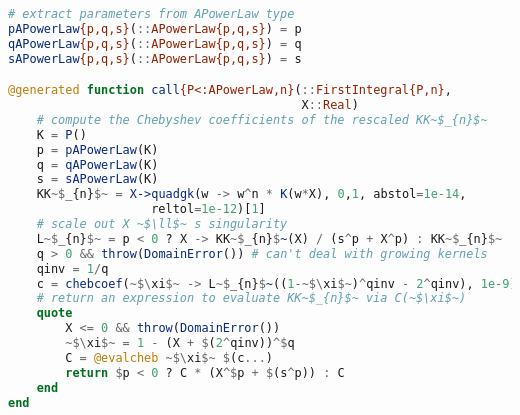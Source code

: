 \begin{singlespace}
\begin{lstlisting}[language=julia]
# extract parameters from APowerLaw type
pAPowerLaw{p,q,s}(::APowerLaw{p,q,s}) = p
qAPowerLaw{p,q,s}(::APowerLaw{p,q,s}) = q
sAPowerLaw{p,q,s}(::APowerLaw{p,q,s}) = s

@generated function call{P<:APowerLaw,n}(::FirstIntegral{P,n},
                                         X::Real)
    # compute the Chebyshev coefficients of the rescaled KK~$_{n}$~
    K = P()
    p = pAPowerLaw(K)
    q = qAPowerLaw(K)
    s = sAPowerLaw(K)
    KK~$_{n}$~ = X->quadgk(w -> w^n * K(w*X), 0,1, abstol=1e-14,
                    reltol=1e-12)[1]
    # scale out X ~$\ll$~ s singularity
    L~$_{n}$~ = p < 0 ? X -> KK~$_{n}$~(X) / (s^p + X^p) : KK~$_{n}$~
    q > 0 && throw(DomainError()) # can't deal with growing kernels
    qinv = 1/q
    c = chebcoef(~$\xi$~ -> L~$_{n}$~((1-~$\xi$~)^qinv - 2^qinv), 1e-9)
    # return an expression to evaluate KK~$_{n}$~ via C(~$\xi$~)
    quote
        X <= 0 && throw(DomainError())
        ~$\xi$~ = 1 - (X + $(2^qinv))^$q
        C = @evalcheb ~$\xi$~ $(c...)
        return $p < 0 ? C * (X^$p + $(s^p)) : C
    end
end

\end{lstlisting}
\end{singlespace}
